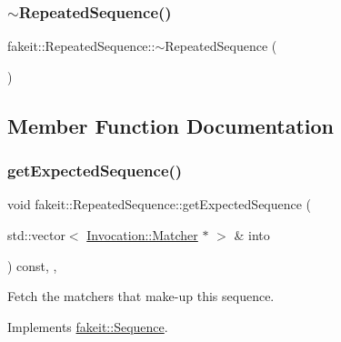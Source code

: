 \subsubsection{\texorpdfstring{$\sim$RepeatedSequence()}{~RepeatedSequence()}\hspace{0.1cm}{\footnotesize\ttfamily [9/9]}}
{\footnotesize\ttfamily fakeit\+::\+Repeated\+Sequence\+::$\sim$\+Repeated\+Sequence (\begin{DoxyParamCaption}{ }\end{DoxyParamCaption})\hspace{0.3cm}{\ttfamily [inline]}}



\subsection{Member Function Documentation}
\mbox{\label{classfakeit_1_1RepeatedSequence_a65b5f62fe0ba9da31b99f28c1a2e53f2}} 
\subsubsection{\texorpdfstring{getExpectedSequence()}{getExpectedSequence()}\hspace{0.1cm}{\footnotesize\ttfamily [1/9]}}
{\footnotesize\ttfamily void fakeit\+::\+Repeated\+Sequence\+::get\+Expected\+Sequence (\begin{DoxyParamCaption}\item[{std\+::vector$<$ \mbox{\hyperlink{structfakeit_1_1Invocation_1_1Matcher}{Invocation\+::\+Matcher}} $\ast$ $>$ \&}]{into }\end{DoxyParamCaption}) const\hspace{0.3cm}{\ttfamily [inline]}, {\ttfamily [override]}, {\ttfamily [virtual]}}



Fetch the matchers that make-\/up this sequence. 



Implements \mbox{\hyperlink{classfakeit_1_1Sequence_aa1a1e4ad2fcac3379ba38f250bf06884}{fakeit\+::\+Sequence}}.

\mbox{\label{classfakeit_1_1RepeatedSequence_a65b5f62fe0ba9da31b99f28c1a2e53f2}} 
